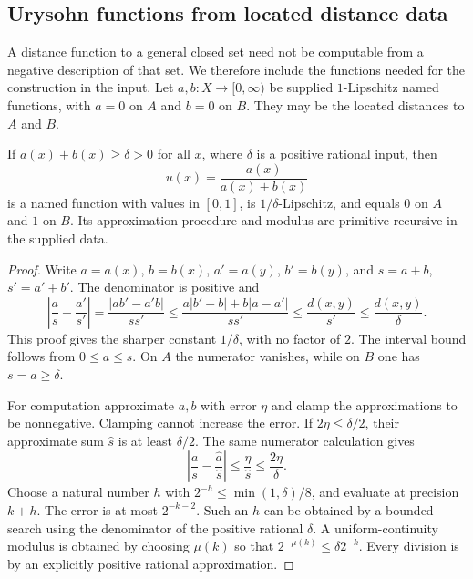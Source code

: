 \subsection{Urysohn functions from located distance data}

A distance function to a general closed set need not be computable from
a negative description of that set.  We therefore include the functions
needed for the construction in the input.  Let $a,b:X\to[0,\infty)$ be
supplied $1$-Lipschitz named functions, with $a=0$ on $A$ and $b=0$ on
$B$.  They may be the located distances to $A$ and $B$.

\begin{theorem}
\label{thm:metric-urysohn}
If $a(x)+b(x)\geq\delta>0$ for all $x$, where $\delta$ is a positive
rational input, then
\begin{equation}\label{eq:urysohn-function}
 u(x)=\frac{a(x)}{a(x)+b(x)}
\end{equation}
is a named function with values in $[0,1]$, is $1/\delta$-Lipschitz,
and equals $0$ on $A$ and $1$ on $B$.  Its approximation procedure and
modulus are primitive recursive in the supplied data.
\end{theorem}
\begin{proof}
Write $a=a(x)$, $b=b(x)$, $a'=a(y)$, $b'=b(y)$, and $s=a+b$,
$s'=a'+b'$.  The denominator is positive and
\[
 \left|\frac{a}{s}-\frac{a'}{s'}\right|
 =\frac{|ab'-a'b|}{ss'}
 \leq\frac{a|b'-b|+b|a-a'|}{ss'}
 \leq\frac{d(x,y)}{s'}\leq\frac{d(x,y)}{\delta}.
\]
This proof gives the sharper constant $1/\delta$, with no factor of $2$.
The interval bound follows from $0\leq a\leq s$.  On $A$ the numerator
vanishes, while on $B$ one has $s=a\geq\delta$.

For computation approximate $a,b$ with error $\eta$ and clamp the
approximations to be nonnegative.  Clamping cannot increase the error.
If $2\eta\leq\delta/2$, their approximate sum $\widehat s$ is at least
$\delta/2$.  The same numerator calculation gives
\[
 \left|\frac{a}{s}-\frac{\widehat a}{\widehat s}\right|
 \leq\frac{\eta}{\widehat s}\leq\frac{2\eta}{\delta}.
\]
Choose a natural number $h$ with
$2^{-h}\leq\min(1,\delta)/8$, and evaluate at precision $k+h$.
The error is at most $2^{-k-2}$.  Such an $h$ can be obtained by a
bounded search using the denominator of the positive rational $\delta$.
A uniform-continuity modulus is obtained by choosing $\mu(k)$ so that
$2^{-\mu(k)}\leq\delta 2^{-k}$.  Every division is by an explicitly
positive rational approximation.
\end{proof}

